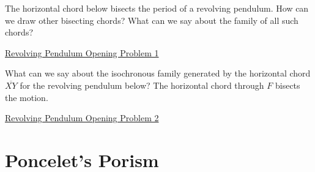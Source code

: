 \documentclass{ximera}
\begin{document}
\begin{exploration}
The horizontal chord below bisects the period of a revolving pendulum. How can we draw other bisecting chords? What can we say about the family of all such chords?

\begin{onlineOnly}
    \begin{center}
\end{center}
\end{onlineOnly}

\href{https://www.desmos.com/calculator/x5fzsfvxdb}{Revolving Pendulum Opening Problem 1}

\end{exploration}

\begin{exploration}
What can we say about the isochronous family generated by the horizontal chord $\overline{XY}$ for the revolving pendulum below? The horizontal chord through $F$ bisects the motion.

\begin{onlineOnly}
    \begin{center}
\end{center}
\end{onlineOnly}

\href{https://www.desmos.com/calculator/1kyfdn6yyc}{Revolving Pendulum Opening Problem 2}

\end{exploration}


\section*{Poncelet's Porism}



\end{document}
